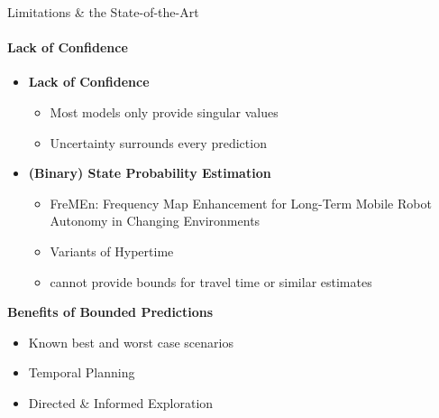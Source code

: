 \documentclass{beamer}
\begin{document}
\begin{frame}[t]{Limitations \& the State-of-the-Art}
  \framesubtitle{Lack of Confidence}

  \begin{itemize}
  \setlength\itemsep{1.0em}
    \item \textbf{Lack of Confidence}
      \begin{itemize}
        \item Most models only provide singular values
        \item Uncertainty surrounds every prediction
      \end{itemize}

    \item \textbf{(Binary) State Probability Estimation}
      \begin{itemize}
        \item \scriptsize FreMEn: Frequency Map Enhancement for Long-Term Mobile Robot Autonomy in Changing Environments \cite{Krajnik2015}
        \item \scriptsize Variants of Hypertime \cite{Krajnik2018} \normalsize
        \item cannot provide bounds for travel time or similar estimates
      \end{itemize}

  \end{itemize}

  \begin{block}{\textbf{Benefits of Bounded Predictions}}
    \begin{itemize}
      \item Known best and worst case scenarios
      \item Temporal Planning \cite{dream2019}
      \item Directed \& Informed Exploration \cite{strands2017}
    \end{itemize}
  \end{block}

\end{frame}
\end{document}
